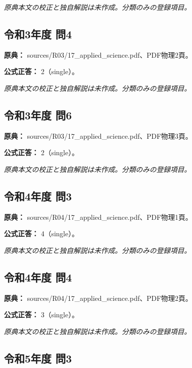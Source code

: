 \par\textit{原典本文の校正と独自解説は未作成。分類のみの登録項目。}

\subsection{令和3年度 問4}
\label{q:r03-reg-applied-04}

\noindent\textbf{原典：} sources/R03/17\_applied\_science.pdf、PDF物理2頁。

\textbf{公式正答：} 2（single）。

\par\textit{原典本文の校正と独自解説は未作成。分類のみの登録項目。}

\subsection{令和3年度 問6}
\label{q:r03-reg-applied-06}

\noindent\textbf{原典：} sources/R03/17\_applied\_science.pdf、PDF物理3頁。

\textbf{公式正答：} 2（single）。

\par\textit{原典本文の校正と独自解説は未作成。分類のみの登録項目。}

\subsection{令和4年度 問3}
\label{q:r04-reg-applied-03}

\noindent\textbf{原典：} sources/R04/17\_applied\_science.pdf、PDF物理1頁。

\textbf{公式正答：} 4（single）。

\par\textit{原典本文の校正と独自解説は未作成。分類のみの登録項目。}

\subsection{令和4年度 問4}
\label{q:r04-reg-applied-04}

\noindent\textbf{原典：} sources/R04/17\_applied\_science.pdf、PDF物理2頁。

\textbf{公式正答：} 3（single）。

\par\textit{原典本文の校正と独自解説は未作成。分類のみの登録項目。}

\subsection{令和5年度 問3}
\label{q:r05-reg-applied-03}

